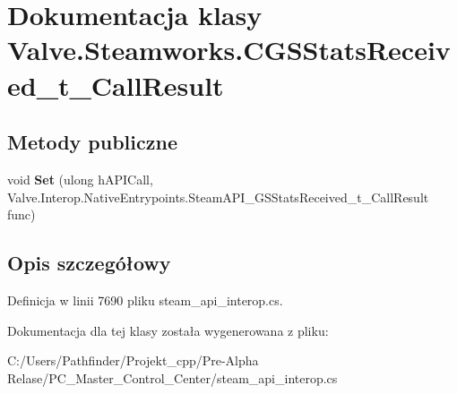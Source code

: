 \hypertarget{class_valve_1_1_steamworks_1_1_c_g_s_stats_received__t___call_result}{}\section{Dokumentacja klasy Valve.\+Steamworks.\+C\+G\+S\+Stats\+Received\+\_\+t\+\_\+\+Call\+Result}
\label{class_valve_1_1_steamworks_1_1_c_g_s_stats_received__t___call_result}
\subsection*{Metody publiczne}
\begin{DoxyCompactItemize}
\item 
\mbox{\label{class_valve_1_1_steamworks_1_1_c_g_s_stats_received__t___call_result_a831281ca1130885121e879d5c3445a83}} 
void {\bfseries Set} (ulong h\+A\+P\+I\+Call, Valve.\+Interop.\+Native\+Entrypoints.\+Steam\+A\+P\+I\+\_\+\+G\+S\+Stats\+Received\+\_\+t\+\_\+\+Call\+Result func)
\end{DoxyCompactItemize}


\subsection{Opis szczegółowy}


Definicja w linii 7690 pliku steam\+\_\+api\+\_\+interop.\+cs.



Dokumentacja dla tej klasy została wygenerowana z pliku\+:\begin{DoxyCompactItemize}
\item 
C\+:/\+Users/\+Pathfinder/\+Projekt\+\_\+cpp/\+Pre-\/\+Alpha Relase/\+P\+C\+\_\+\+Master\+\_\+\+Control\+\_\+\+Center/steam\+\_\+api\+\_\+interop.\+cs\end{DoxyCompactItemize}
